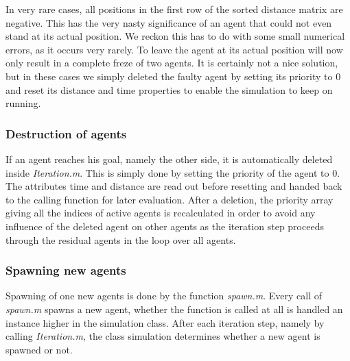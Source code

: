 \noi In very rare cases, all positions in the first row of the sorted distance matrix are negative. This has the very nasty significance of an agent that could not even stand at its actual position. We reckon this has to do with some small numerical errors, as it occurs very rarely. To leave the agent at its actual position will now only result in a complete freze of two agents. It is certainly not a nice solution, but in these cases we simply deleted the faulty agent by setting its priority to 0 and reset its distance and time properties to enable the simulation to keep on running.

\subsubsection{Destruction of agents}
If an agent reaches his goal, namely the other side, it is automatically deleted inside \textit{Iteration.m}. This is simply done by setting the priority of the agent to 0. The attributes time and distance are read out before resetting and handed back to the calling function for later evaluation. After a deletion, the priority array giving all the indices of active agents is recalculated in order to avoid any influence of the deleted agent on other agents as the iteration step proceeds through the residual agents in the loop over all agents.

\subsubsection{Spawning new agents}
Spawning of one new agents is done by the function \textit{spawn.m}. Every call of \textit{spawn.m} spawns a new agent, whether the function is called at all is handled an instance higher in the simulation class. After each iteration step, namely by calling \textit{Iteration.m}, the class simulation determines whether a new agent is spawned or not.\\

